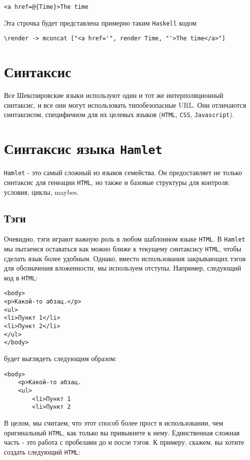 \begin{lstlisting}
<a href=@{Time}>The time
\end{lstlisting}

Эта строчка будет представлена примерно таким \texttt{Haskell} кодом

\begin{lstlisting}
\render -> mconcat ["<a href='", render Time, "'>The time</a>"]
\end{lstlisting}

\section{Синтаксис}
Все Шекспировские языки используют один и тот же интерполяционный синтаксис,
и все они могут использовать типобезопасные URL. Они отличаются синтаксисом,
специфичном для их целевых языков (\texttt{HTML}, \texttt{CSS}, \texttt{Javascript}).

\section{Синтаксис языка \texttt{Hamlet}}
\texttt{Hamlet} - это самый сложный из языков семейства. Он предоставляет не только
синтаксис для генеации \texttt{HTML}, но также и базовые структуры для контроля:
условия, циклы, maybes.

\subsection{Тэги}
Очевидно, тэги играют важную роль в любом шаблонном языке \texttt{HTML}. В \texttt{Hamlet}
мы пытаемся оставаться как можно ближе к текущему синтаксису \texttt{HTML}, чтобы
сделать язык более удобным. Однако, вместо использования закрывающих тэгов
для обозначения вложенности, мы используем отступы. Например, следующий код
в \texttt{HTML}:

\begin{lstlisting}
<body>
<p>Какой-то абзац.</p>
<ul>
<li>Пункт 1</li>
<li>Пункт 2</li>
</ul>
</body>
\end{lstlisting}

будет выглядеть следующим образом:
\begin{lstlisting}
<body>
    <p>Какой-то абзац.
    <ul>
        <li>Пункт 1
        <li>Пункт 2
\end{lstlisting}

В целом, мы считаем, что этот способ более прост в использовании, чем
оригинальный \texttt{HTML}, как только вы привыкнете к нему. Единственная сложная часть
 - это работа с пробелами до и после тэгов. К примеру, скажем, вы хотите
создать следующий \texttt{HTML}:


